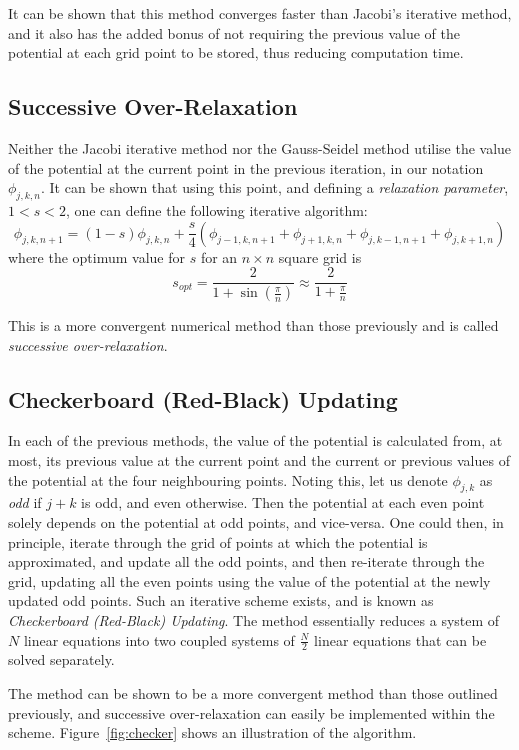 \documentclass[12pt, a4paper]{article}
\newcommand{\be}{\begin{equation}}
\newcommand{\ee}{\end{equation}}
\begin{document}
It can be shown that this method converges faster than Jacobi's iterative
method, and it also has the added bonus of not requiring the previous value of the 
potential at each grid point to be stored, thus reducing computation time.

\subsection{Successive Over-Relaxation}

Neither the Jacobi iterative method nor the Gauss-Seidel method utilise the value
of the potential at the current point in the previous iteration, in our notation
$\phi_{j,k,n}$. It can be shown that using this point, and defining a
\emph{relaxation parameter}, $1<s<2$, one can define the following iterative algorithm:
%
\be
\phi_{j,k,n+1}= (1-s)\phi_{j,k,n}+\frac{s}{4}(\phi_{j-1,k,n+1}+\phi_{j+1,k,n}+\phi_{j,k-1,n+1}+\phi_{j,k+1,n})
\ee
%
where the optimum value for $s$ for an $n \times n$ square grid is
\be
s_{opt} = \frac{2}{1+\sin(\frac{\pi}{n})} \approx \frac{2}{1+\frac{\pi}{n}}
\ee

This is a more convergent numerical method than those previously and is called 
\emph{successive over-relaxation}.

%

\subsection{Checkerboard (Red-Black) Updating}

In each of the previous methods, the value of the potential is calculated from, at most,
its previous value at the current point and the current or previous values of the
potential at the four neighbouring points. Noting this, let us denote $\phi_{j,k}$ as
\emph{odd} if $j+k$ is odd, and even otherwise. Then the potential at each even point
solely depends on the potential at odd points, and vice-versa. One could then, in
principle, iterate through the grid of points at which the potential is approximated,
and update all the odd points, and then re-iterate through the grid, updating all the
even points using the value of the potential at the newly updated odd points. Such an
iterative scheme exists, and is known as \emph{Checkerboard (Red-Black) Updating}. The
method essentially reduces a system of $N$ linear equations into two coupled systems
of $\frac{N}{2}$ linear equations that can be solved separately.

The method can be shown to be a more convergent method than those outlined previously,
and successive over-relaxation can easily be implemented within the scheme.
Figure~\ref{fig:checker} shows an illustration of the algorithm.
\end{document}
